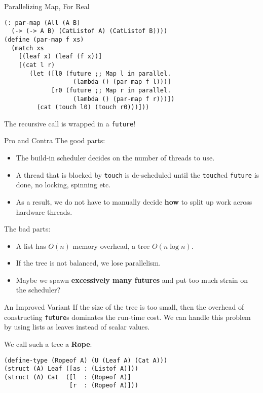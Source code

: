 \documentclass{beamer}
\begin{document}
\begin{frame}[fragile]{Parallelizing Map, For Real}
\begin{lstlisting}
(: par-map (All (A B)
  (-> (-> A B) (CatListof A) (CatListof B))))
(define (par-map f xs)
  (match xs
    [(leaf x) (leaf (f x))]
    [(cat l r)
       (let ([l0 (future ;; Map l in parallel.
                   (lambda () (par-map f l)))]
             [r0 (future ;; Map r in parallel.
                   (lambda () (par-map f r)))])
         (cat (touch l0) (touch r0)))]))
\end{lstlisting}

The recursive call is wrapped in a \lstinline{future}!
\end{frame}

\begin{frame}{Pro and Contra}
  The good parts:

  \begin{itemize}
  \item The build-in scheduler decides on the number of threads to use.
  \item A thread that is blocked by \lstinline{touch} is de-scheduled until the \lstinline{touch}ed \lstinline{future} is done, no locking, spinning etc.
  \item As a result, we do not have to manually decide \textbf{how} to split up work across hardware threads.
  \end{itemize}

  \pause{}

  The bad parts:
  \begin{itemize}
  \item A list has $O(n)$ memory overhead, a tree $O(n \log n)$.
  \item If the tree is not balanced, we lose parallelism.
  \item Maybe we spawn \textbf{excessively many futures} and put too much strain on the scheduler?
  \end{itemize}
\end{frame}

\begin{frame}[fragile]{An Improved Variant}
If the size of the tree is too small, then the overhead of constructing \lstinline{future}s dominates the run-time cost. We can handle this problem by using lists as leaves instead of scalar values.

\vspace{0.5cm}

We call such a tree a \textbf{Rope}:

\begin{lstlisting}
(define-type (Ropeof A) (U (Leaf A) (Cat A)))
(struct (A) Leaf ([as : (Listof A)]))
(struct (A) Cat  ([l  : (Ropeof A)]
                  [r  : (Ropeof A)]))
\end{lstlisting}
\end{frame}
\end{document}

